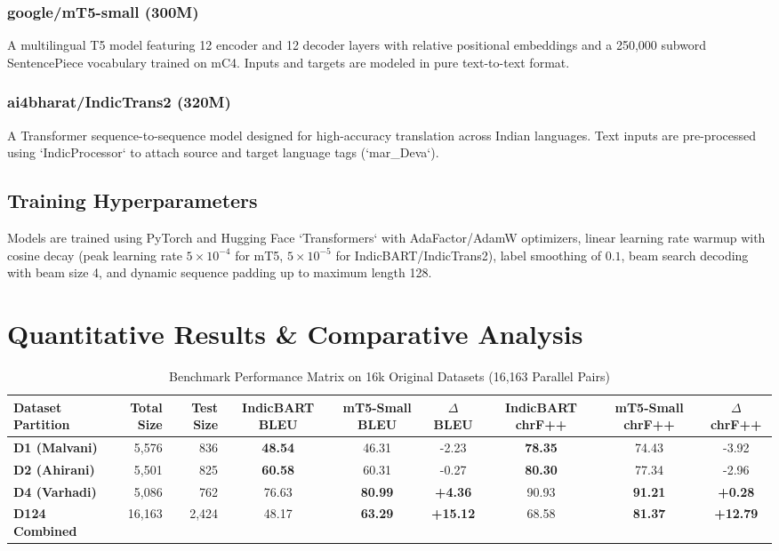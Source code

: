 \documentclass[journal,twocolumn]{IEEEtran}
\begin{document}
\subsubsection{google/mT5-small (300M)}
A multilingual T5 model featuring 12 encoder and 12 decoder layers with relative positional embeddings and a 250,000 subword SentencePiece vocabulary trained on mC4. Inputs and targets are modeled in pure text-to-text format.

\subsubsection{ai4bharat/IndicTrans2 (320M)}
A Transformer sequence-to-sequence model designed for high-accuracy translation across Indian languages. Text inputs are pre-processed using `IndicProcessor` to attach source and target language tags (`mar_Deva`).

\subsection{Training Hyperparameters}
Models are trained using PyTorch and Hugging Face `Transformers` with AdaFactor/AdamW optimizers, linear learning rate warmup with cosine decay (peak learning rate $5 \times 10^{-4}$ for mT5, $5 \times 10^{-5}$ for IndicBART/IndicTrans2), label smoothing of $0.1$, beam search decoding with beam size 4, and dynamic sequence padding up to maximum length 128.

\section{Quantitative Results \& Comparative Analysis}

\begin{table}[t]
\caption{Benchmark Performance Matrix on 16k Original Datasets (16,163 Parallel Pairs)}
\label{tab:results_16k}
\centering
\begin{tabularx}{\textwidth}{l r r c c c c c c}
\toprule
\textbf{Dataset Partition} & \textbf{Total Size} & \textbf{Test Size} & \textbf{IndicBART BLEU} & \textbf{mT5-Small BLEU} & \textbf{$\Delta$ BLEU} & \textbf{IndicBART chrF++} & \textbf{mT5-Small chrF++} & \textbf{$\Delta$ chrF++} \\
\midrule
\textbf{D1 (Malvani)} & 5,576 & 836 & \textbf{48.54} & 46.31 & -2.23 & \textbf{78.35} & 74.43 & -3.92 \\
\textbf{D2 (Ahirani)} & 5,501 & 825 & \textbf{60.58} & 60.31 & -0.27 & \textbf{80.30} & 77.34 & -2.96 \\
\textbf{D4 (Varhadi)} & 5,086 & 762 & 76.63 & \textbf{80.99} & \textbf{+4.36} & 90.93 & \textbf{91.21} & \textbf{+0.28} \\
\midrule
\textbf{D124 Combined} & 16,163 & 2,424 & 48.17 & \textbf{63.29} & \textbf{+15.12} & 68.58 & \textbf{81.37} & \textbf{+12.79} \\
\bottomrule
\end{tabularx}
\end{table}
\end{document}

